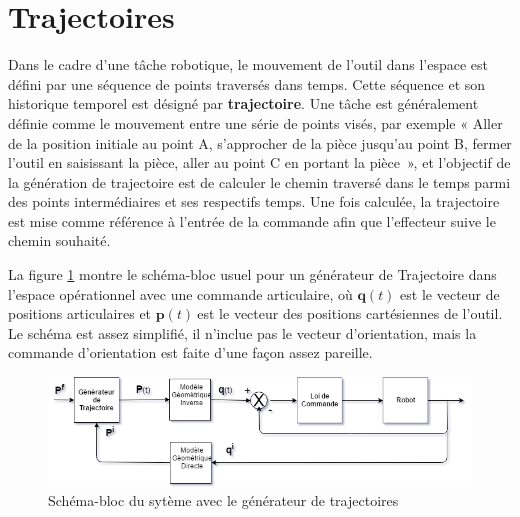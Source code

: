 \documentclass{article} %
\begin{document}

\section{Trajectoires}

\noindent 

Dans le cadre d'une t\^{a}che robotique, le mouvement de l'outil dans l'espace est d\'{e}fini par une s\'{e}quence de points travers\'{e}s dans temps. Cette s\'{e}quence et son historique temporel est d\'{e}sign\'{e} par \textbf{trajectoire}. Une t\^{a}che est g\'{e}n\'{e}ralement d\'{e}finie comme le mouvement entre une s\'{e}rie de points vis\'{e}s, par exemple « Aller de la position initiale au point A, s'approcher de la pi\`{e}ce jusqu'au point B, fermer l'outil en saisissant la pi\`{e}ce, aller au point C en portant la pi\`{e}ce~», et l'objectif de la g\'{e}n\'{e}ration de trajectoire est de calculer le chemin travers\'{e} dans le temps parmi des points interm\'{e}diaires et ses respectifs temps. Une fois calcul\'{e}e, la trajectoire est mise comme r\'{e}f\'{e}rence \`{a} l'entr\'{e}e de la commande afin que l'effecteur suive le chemin souhait\'{e}.

La figure \ref{eller1} montre le sch\'{e}ma-bloc usuel pour un g\'{e}n\'{e}rateur de Trajectoire dans l'espace op\'{e}rationnel avec une commande articulaire, o\`{u} $\boldsymbol{q}\left(t\right)$ est le vecteur de positions articulaires et $\boldsymbol{p}\left(t\right)\ $est le vecteur des positions cart\'{e}siennes de l'outil. Le sch\'{e}ma est assez simplifi\'{e}, il n'inclue pas le vecteur d'orientation, mais la commande d'orientation est faite d'une fa\c{c}on assez pareille.
\\

\begin{figure}[h]	%
\includegraphics[width=\textwidth]{TrajFig1.png}
\caption{Sch\'{e}ma-bloc du syt\`{e}me avec le g\'{e}n\'{e}rateur de trajectoires}
\label{eller1}
\end{figure}

\
\end{document}
